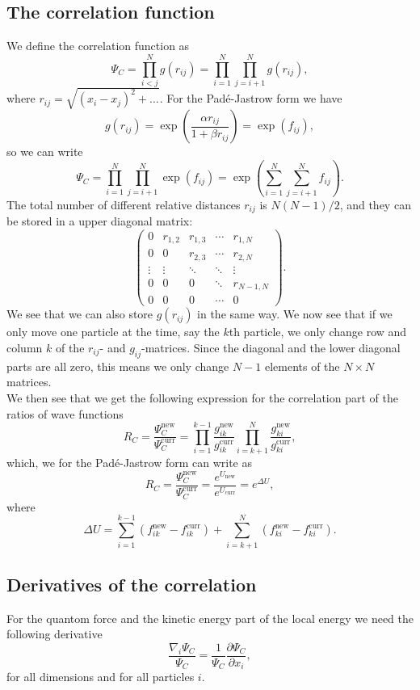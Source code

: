 \subsection*{The correlation function}
We define the correlation function as
\[
    \Psi_C = \prod_{i<j}^N g(r_{ij}) = \prod_{i=1}^N\prod_{j=i+1}^N g(r_{ij}),
\]
where $r_{ij} = \sqrt{(x_i - x_j)^2 + \dots}$. For the Pad\'e-Jastrow form we have
\[
    g(r_{ij}) = \exp\left(\frac{\alpha r_{ij}}{1 + \beta r_{ij}}\right) = \exp(f_{ij}),
\]
so we can write
\[
    \Psi_C = \prod_{i=1}^N\prod_{j=i+1}^N \exp(f_{ij}) = \exp\left(\sum_{i=1}^N\sum_{j=i+1}^N f_{ij} \right).
\]
The total number of different relative distances $r_{ij}$ is $N(N-1)/2$, and they can be stored in a upper diagonal matrix:
\[
    \begin{pmatrix}
    0      & r_{1,2} & r_{1,3} & \cdots & r_{1,N} \\
    0      & 0       & r_{2,3} & \cdots & r_{2,N} \\
    \vdots & \vdots  & \ddots  & \ddots & \vdots \\
    0      & 0       & 0       & \ddots & r_{N-1, N} \\
    0      & 0       & 0       & \cdots & 0
    \end{pmatrix}.
\]
We see that we can also store $g(r_{ij})$ in the same way. We now see that if we only move one particle at the time, say the $k$th particle, we only change row and column $k$ of the $r_{ij}$- and $g_{ij}$-matrices. Since the diagonal and the lower diagonal parts are all zero, this means we only change $N-1$ elements of the $N\times N$ matrices.\\

We then see that we get the following expression for the correlation part of the ratios of wave functions
\[
    R_C = \frac{\Psi_C^\text{new}}{\Psi_C^\text{curr}} = \prod_{i=1}^{k-1} \frac{g_{ik}^\text{new}}{g_{ik}^\text{curr}} \prod_{i = k+1}^{N} \frac{g_{ki}^\text{new}}{g_{ki}^\text{curr}},
\]
which, we for the Pad\'e-Jastrow form can write as
\[
    R_C = \frac{\Psi_C^\text{new}}{\Psi_C^\text{curr}} = \frac{e^{U_\text{new}}}{e^{U_\text{curr}}} = e^{\Delta U},
\]
where
\[
    \Delta U = \sum_{i = 1}^{k-1}(f_{ik}^\text{new} - f_{ik}^\text{curr}) + \sum_{i = k+1}^N(f_{ki}^\text{new} - f_{ki}^\text{curr}).
\]

\subsection*{Derivatives of the correlation}
For the quantom force and the kinetic energy part of the local energy we need the following derivative
\[
    \frac{\nabla_i \Psi_C}{\Psi_C} = \frac{1}{\Psi_C}\frac{\partial \Psi_C}{\partial x_i},
\]
for all dimensions and for all particles $i$.\\


